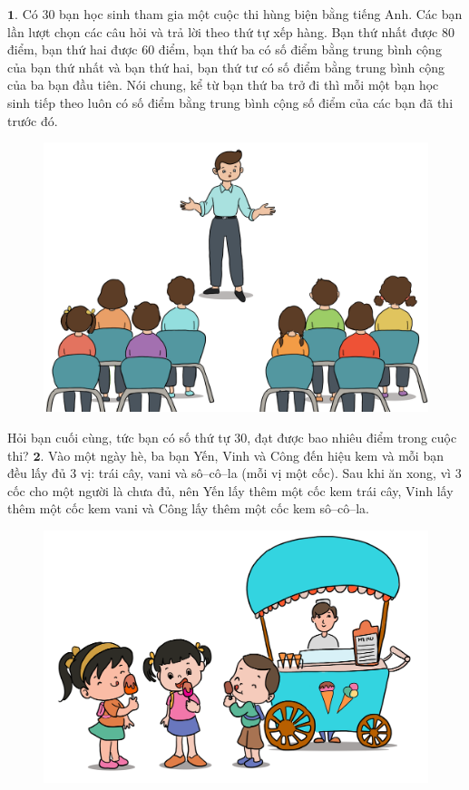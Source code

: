 \begin{multicols}{2}
	$\pmb{1.}$ Có $30$ bạn học sinh tham gia một cuộc thi hùng biện bằng tiếng Anh. Các bạn lần lượt chọn các câu hỏi và trả lời theo thứ tự xếp hàng. Bạn thứ nhất được $80$ điểm, bạn thứ hai được $60$ điểm, bạn thứ ba có số điểm bằng trung bình cộng của bạn thứ nhất và bạn thứ hai, bạn thứ tư có số điểm bằng trung bình cộng của ba bạn đầu tiên. Nói chung, kể từ bạn thứ ba trở đi thì  mỗi một bạn học sinh tiếp theo luôn có số điểm bằng trung bình cộng số điểm của các bạn đã thi trước đó. 
	\begin{figure}[H]
		\centering
		\vspace*{-5pt}
		\captionsetup{labelformat= empty, justification=centering}
		\includegraphics[width=0.92\linewidth]{bai1}
	\end{figure}
	Hỏi bạn cuối cùng, tức bạn có số thứ tự $30$, đạt được bao nhiêu điểm trong cuộc thi? 
	\vskip 0.1cm
	$\pmb{2.}$ Vào một ngày hè, ba bạn Yến, Vinh và Công đến hiệu kem và mỗi bạn đều lấy đủ $3$ vị: trái cây, vani và sô--cô--la (mỗi vị một cốc). Sau khi ăn xong, vì $3$ cốc cho một người là chưa đủ, nên Yến lấy thêm một cốc kem trái cây, Vinh lấy thêm một cốc kem vani và Công lấy thêm một cốc kem sô--cô--la. 
	\begin{figure}[H]
		\centering
		\vspace*{-5pt}
		\captionsetup{labelformat= empty, justification=centering}
		\includegraphics[width=0.9\linewidth]{bai2}

\end{figure}
\end{multicols}
